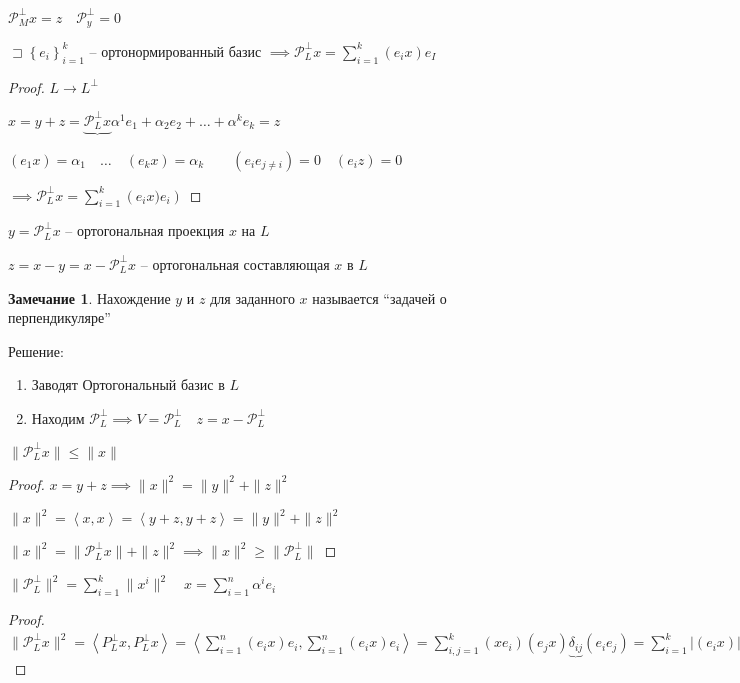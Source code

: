 \documentclass{book}
\theoremstyle{definition}
\newtheorem*{note}{Замечание}
\begin{document}
$\mathcal P_M^{\perp} x = z\quad \mathcal P_y^{\perp} = 0$

 \begin{lemma}
     $\sqsupset \left\{ e_i \right\} _{i=1}^k$ -- ортонормированный базис $\implies \mathcal P_L^{\perp} x = \sum_{i=1}^{k} (e_i x)e_I$
\end{lemma}
\begin{proof}
    $L \to L^{\perp}$

    $x = y + z = \underbrace{\mathcal P_L^{\perp} x}{\alpha^1e_1 + \alpha_2 e_2 + \ldots + \alpha^ke_k} = z$

    $(e_1 x) = \alpha_1\quad \ldots\quad (e_k x) = \alpha_k\qquad (e_i e_{j\neq i}) = 0\quad (e_i z) = 0$

    $\implies \mathcal P_L^{\perp} x = \sum_{i=1}^{k} \left( e_i x)e_i \right) $
\end{proof}

\begin{definition}
    $y = \mathcal P_L^{\perp} x$ -- ортогональная проекция  $x$ на  $L$

    $z = x- y = x - \mathcal P_L^{\perp} x$ -- ортогональная составляющая  $x$ в $L$
\end{definition}

\begin{note}
    Нахождение $y$ и $z$ для заданного $x$ называется ``задачей о перпендикуляре''

    Решение:
    \begin{enumerate}
        \item Заводят Ортогональный базис в $L$
        \item Находим  $\mathcal P_L^{\perp } \implies  V = \mathcal P_L^{\perp}\quad z = x - \mathcal P_L^{\perp}$
    \end{enumerate}
\end{note}

\begin{lemma}
    $\|\mathcal P_L^{\perp} x\| \leqslant \|x\|$ 
\end{lemma}
\begin{proof}
    $x = y + z \implies \|x\|^2 = \|y\|^2  + \|z\|^2$

    $\|x\|^2 = \left< x, x \right> = \left<y + z, y + z \right> = \|y\|^2 + \|z\|^2$

    $\|x\|^2 = \|\mathcal P_L^{\perp} x\| + \|z\|^2 \implies \|x\|^2 \geqslant  \|\mathcal P_L^{\perp}\|$
\end{proof}

\begin{lemma}
    $\|\mathcal P_L^{\perp}\|^2 = \sum_{i=1}^{k} \|x^i\|^2\quad x = \sum_{i=1}^{n} \alpha^ie_i$
\end{lemma}
\begin{proof}
    $\|\mathcal P_L^{\perp} x\|^2 = \left<P_L^{\perp} x, P_L^{\perp} x \right> = \left< \sum_{i=1}^{n} \left( e_i x \right) e_i, \sum_{i=1}^{n} \left( e_i x \right) e_i \right>  = \sum_{i, j = 1}^{k} \left( x e_i \right) (e_j x) \underbrace{\delta_{i j}}{(e_i e_j)} = \sum_{i=1}^{k} |(e_i x)|^2 = \sum_{i=1}^{n} |\alpha^i|^2$
\end{proof}
\end{document}
